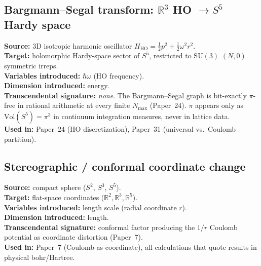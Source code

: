 \documentclass[11pt]{article}
\begin{document}
\subsection{Bargmann--Segal transform: $\mathbb{R}^3$ HO $\to S^5$ Hardy space}
\label{sec:proj_bargmann}
\textbf{Source:} 3D isotropic harmonic oscillator
$H_{\text{HO}} = \tfrac{1}{2}p^2 + \tfrac{1}{2}\omega^2 r^2$.\\
\textbf{Target:} holomorphic Hardy-space sector of $S^5$, restricted
to $\mathrm{SU}(3)$ $(N,0)$ symmetric irreps.\\
\textbf{Variables introduced:} $\hbar\omega$ (HO frequency).\\
\textbf{Dimension introduced:} energy.\\
\textbf{Transcendental signature:} \emph{none}.  The Bargmann--Segal
graph is bit-exactly $\pi$-free in rational arithmetic at every
finite $N_\text{max}$ (Paper~24).  $\pi$ appears only as
$\mathrm{Vol}(S^5) = \pi^3$ in continuum integration measures, never
in lattice data.\\
\textbf{Used in:} Paper~24 (HO discretization), Paper~31 (universal
vs.\ Coulomb partition).

\subsection{Stereographic / conformal coordinate change}
\label{sec:proj_stereo}
\textbf{Source:} compact sphere ($S^2$, $S^3$, $S^5$).\\
\textbf{Target:} flat-space coordinates ($\mathbb{R}^2, \mathbb{R}^3,
\mathbb{R}^5$).\\
\textbf{Variables introduced:} length scale (radial coordinate $r$).\\
\textbf{Dimension introduced:} length.\\
\textbf{Transcendental signature:} conformal factor producing the
$1/r$ Coulomb potential as coordinate distortion (Paper~7).\\
\textbf{Used in:} Paper~7 (Coulomb-as-coordinate), all calculations
that quote results in physical bohr/Hartree.
\end{document}
